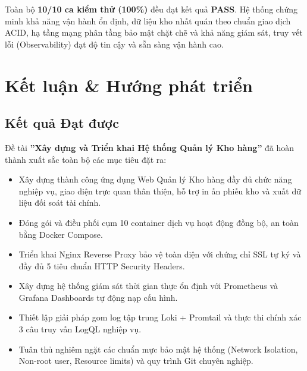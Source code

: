 \documentclass[12pt,a4paper,oneside]{report}
\begin{document}
\begin{tcolorbox}[
    enhanced,
    colback=passbg!30,
    colframe=passgreen,
    arc=2mm,
    title=\textbf{\color{passgreen}Kết luận Đánh giá Thực nghiệm},
    fonttitle=\normalsize\bfseries
]
Toàn bộ \textbf{10/10 ca kiểm thử (100\%)} đều đạt kết quả \textbf{PASS}. Hệ thống chứng minh khả năng vận hành ổn định, dữ liệu kho nhất quán theo chuẩn giao dịch ACID, hạ tầng mạng phân tầng bảo mật chặt chẽ và khả năng giám sát, truy vết lỗi (Observability) đạt độ tin cậy và sẵn sàng vận hành cao.
\end{tcolorbox}

\chapter{Kết luận \& Hướng phát triển}
\enlargethispage{2\baselineskip}
\begingroup
{}
\setlength{\parskip}{1.5pt}

\section{Kết quả Đạt được}
Đề tài \textbf{''Xây dựng và Triển khai Hệ thống Quản lý Kho hàng''} đã hoàn thành xuất sắc toàn bộ các mục tiêu đặt ra:
\begin{itemize}[itemsep=1pt, topsep=1.5pt, parsep=0pt]
    \item Xây dựng thành công ứng dụng Web Quản lý Kho hàng đầy đủ chức năng nghiệp vụ, giao diện trực quan thân thiện, hỗ trợ in ấn phiếu kho và xuất dữ liệu đối soát tài chính.
    \item Đóng gói và điều phối cụm 10 container dịch vụ hoạt động đồng bộ, an toàn bằng Docker Compose.
    \item Triển khai Nginx Reverse Proxy bảo vệ toàn diện với chứng chỉ SSL tự ký và đầy đủ 5 tiêu chuẩn HTTP Security Headers.
    \item Xây dựng hệ thống giám sát thời gian thực ổn định với Prometheus và Grafana Dashboards tự động nạp cấu hình.
    \item Thiết lập giải pháp gom log tập trung Loki + Promtail và thực thi chính xác 3 câu truy vấn LogQL nghiệp vụ.
    \item Tuân thủ nghiêm ngặt các chuẩn mực bảo mật hệ thống (Network Isolation, Non-root user, Resource limits) và quy trình Git chuyên nghiệp.
\end{itemize}
\end{document}
